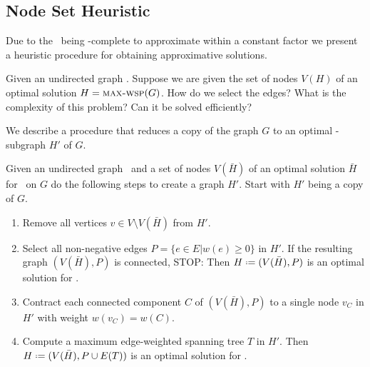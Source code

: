 \subsection{Node Set Heuristic}
\label{sec:approximation:nodeset}

Due to the \WSP\ being \NP-complete to approximate within a constant factor we present a heuristic procedure for obtaining approximative solutions.\medskip

Given an undirected graph \ugraph. Suppose we are given the set of nodes $V(H)$ of an optimal solution $H = \text{\textsc{max-wsp}}(G)$. How do we select the edges? What is the complexity of this problem? Can it be solved efficiently?\medskip

We describe a procedure that reduces a copy of the graph $G$ to an optimal \maxWSP-subgraph $H'$ of $G$.

\begin{procedure}
	\label{proc:gwspgivennodes}
	Given an undirected graph \ugraph\ and a set of nodes $V(\bar{H})$ of an optimal solution $\bar{H}$ for \maxWSP\ on $G$ do the following steps to create a graph $H'$. Start with $H'$ being a copy of $G$.
	\begin{enumerate}
		\item Remove all vertices $v \in V \setminus V(\bar{H})$ from $H'$.
		\item Select all non-negative edges $P = \{e \in E | w(e) \geq 0\}$ in $H'$. If the resulting graph $(V(\bar{H}), P)$ is connected, STOP: Then $H \defeq (V(\bar{H}), P)$ is an optimal solution for \maxWSP.
		\item Contract each connected component $C$ of $(V(\bar{H}), P)$ to a single node $v_C$ in $H'$ with weight $w(v_C) = w(C)$.
		\item Compute a maximum edge-weighted spanning tree $T$ in $H'$. Then $H \defeq (V(\bar{H}), P \cup E(T))$ is an optimal solution for \maxWSP.
	\end{enumerate}
\end{procedure} 

